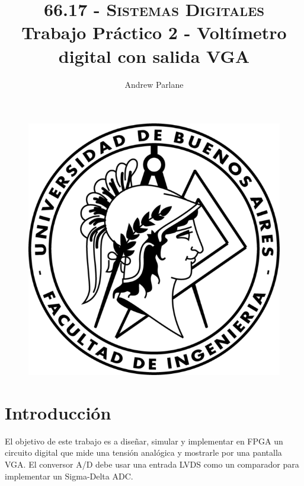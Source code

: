 \documentclass[a4paper]{article}
\begin{document}
\begin{figure}
\centering
\includegraphics[scale=1]{./img/logo-facu}
\end{figure}

\title{\large\textsc{66.17 - Sistemas Digitales}\\
\large Trabajo Práctico 2 - Voltímetro digital con salida VGA}

\author{
Andrew Parlane \\
}

\maketitle

\newpage

\tableofcontents

\listoffigures

\newpage

\section{Introducción}

El objetivo de este trabajo es a diseñar, simular y implementar en FPGA un circuito digital que mide una tensión analógica y mostrarle por una pantalla VGA. El conversor A/D debe usar una entrada LVDS como un comparador para implementar un Sigma-Delta ADC.
\end{document}
